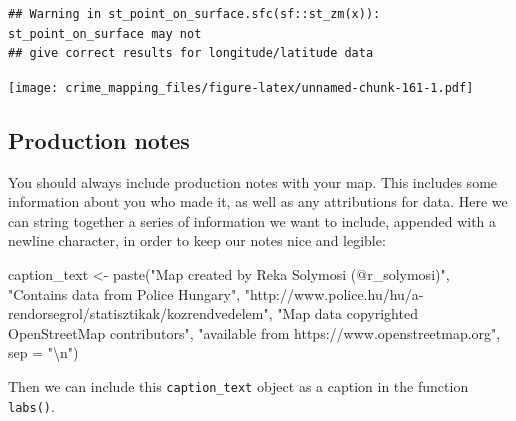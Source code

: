 \documentclass[
]{book}
\newenvironment{Shaded}{\begin{snugshade}}{\end{snugshade}}
\newcommand{\AttributeTok}[1]{\textcolor[rgb]{0.77,0.63,0.00}{#1}}
\newcommand{\FunctionTok}[1]{\textcolor[rgb]{0.00,0.00,0.00}{#1}}
\newcommand{\NormalTok}[1]{#1}
\newcommand{\OtherTok}[1]{\textcolor[rgb]{0.56,0.35,0.01}{#1}}
\newcommand{\SpecialCharTok}[1]{\textcolor[rgb]{0.00,0.00,0.00}{#1}}
\newcommand{\StringTok}[1]{\textcolor[rgb]{0.31,0.60,0.02}{#1}}
\begin{document}
\begin{verbatim}
## Warning in st_point_on_surface.sfc(sf::st_zm(x)): st_point_on_surface may not
## give correct results for longitude/latitude data
\end{verbatim}

\texttt{[image: crime\_mapping\_files/figure-latex/unnamed-chunk-161-1.pdf]}

\hypertarget{production-notes}{%
\subsection{Production notes}\label{production-notes}}

You should always include production notes with your map. This includes some information about you who made it, as well as any attributions for data. Here we can string together a series of information we want to include, appended with a newline character, in order to keep our notes nice and legible:

\begin{Shaded}
\begin{Highlighting}[]
\NormalTok{caption\_text }\OtherTok{\textless{}{-}} \FunctionTok{paste}\NormalTok{(}\StringTok{"Map created by Reka Solymosi (@r\_solymosi)"}\NormalTok{, }
                       \StringTok{"Contains data from Police Hungary"}\NormalTok{,}
                       \StringTok{"http://www.police.hu/hu/a{-}rendorsegrol/statisztikak/kozrendvedelem"}\NormalTok{, }
                       \StringTok{"Map data copyrighted OpenStreetMap contributors"}\NormalTok{, }
                       \StringTok{"available from https://www.openstreetmap.org"}\NormalTok{, }
                       \AttributeTok{sep =} \StringTok{"}\SpecialCharTok{\textbackslash{}n}\StringTok{"}\NormalTok{)}
\end{Highlighting}
\end{Shaded}

Then we can include this \texttt{caption\_text} object as a caption in the function \texttt{labs()}.
\end{document}
